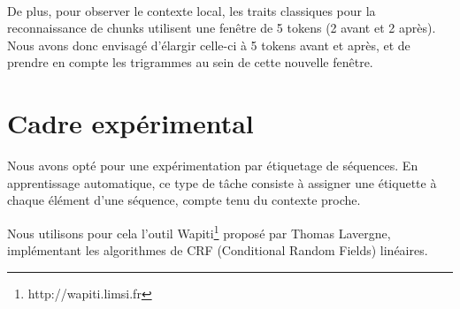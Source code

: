\documentclass[a4paper,12pt]{article}
\begin{document}
\paragraph{}
De plus, pour observer le contexte local, les traits classiques pour la reconnaissance de chunks utilisent une fenêtre de 5 tokens (2 avant et 2 après). Nous avons donc envisagé d'élargir celle-ci à 5 tokens avant et après, et de prendre en compte les trigrammes au sein de cette nouvelle fenêtre.

% 
% 


\section{Cadre expérimental}
\label{xp}

Nous avons opté pour une expérimentation par étiquetage de séquences. En apprentissage automatique, ce type de tâche consiste à assigner une étiquette à chaque élément d'une séquence, compte tenu du contexte proche.

Nous utilisons pour cela l'outil Wapiti\footnote{http://wapiti.limsi.fr} proposé par Thomas Lavergne, implémentant les algorithmes de CRF (Conditional Random Fields) linéaires.
\end{document}
